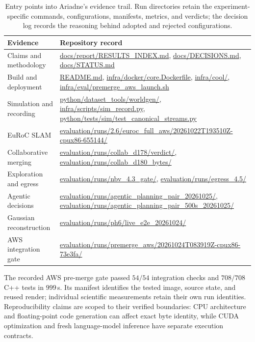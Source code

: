 \documentclass[10pt,a4paper]{article}
\renewcommand{\arraystretch}{1.12}
\newcommand{\ev}[1]{\url{#1}}
\begin{document}
\begin{table}[t]
\centering
\small
\setlength{\tabcolsep}{5pt}
\renewcommand{\arraystretch}{1.12}
\begin{tabular}{@{}P{3.0cm}P{12.4cm}@{}}
\toprule
\textbf{Evidence} & \textbf{Repository record} \\
\midrule
Claims and methodology &
\ev{docs/report/RESULTS_INDEX.md},
\ev{docs/DECISIONS.md},
\ev{docs/STATUS.md} \\

Build and deployment &
\ev{README.md},
\ev{infra/docker/core.Dockerfile},
\ev{infra/cool/},
\ev{infra/eval/premerge_aws_launch.sh} \\

Simulation and recording &
\ev{python/dataset_tools/worldgen/},
\ev{infra/scripts/sim_record.py},
\ev{python/tests/sim/test_canonical_streams.py} \\

EuRoC SLAM &
\ev{evaluation/runs/2.6/euroc_full_aws/20261022T193510Z-cpux86-655144/} \\

Collaborative merging &
\ev{evaluation/runs/collab_d178/verdict/},
\ev{evaluation/runs/collab_d180_bytes/} \\

Exploration and egress &
\ev{evaluation/runs/nbv_4.3_gate/},
\ev{evaluation/runs/egress_4.5/} \\

Agentic decisions &
\ev{evaluation/runs/agentic_planning_pair_20261025/},
\ev{evaluation/runs/agentic_planning_pair_500s_20261025/} \\

Gaussian reconstruction &
\ev{evaluation/runs/ph6/live_e2e_20261024/} \\

AWS integration gate &
\ev{evaluation/runs/premerge_aws/20261024T083919Z-cpux86-73e3fa/} \\
\bottomrule
\end{tabular}
\caption{Entry points into Ariadne's evidence trail.
Run directories retain the experiment-specific commands,
configurations, manifests, metrics, and verdicts; the
decision log records the reasoning behind adopted and
rejected configurations.}
\label{tab:evidence-index}
\end{table}

The recorded AWS pre-merge gate passed \textbf{$54/54$}
integration checks and \textbf{$708/708$} C++ tests in
$999$\,s. Its manifest identifies the tested image,
source state, and reused render; individual scientific
measurements retain their own run identities.
Reproducibility claims are scoped to their verified
boundaries: CPU architecture and floating-point code
generation can affect exact byte identity, while CUDA
optimization and fresh language-model inference have
separate execution contracts.
\end{document}
